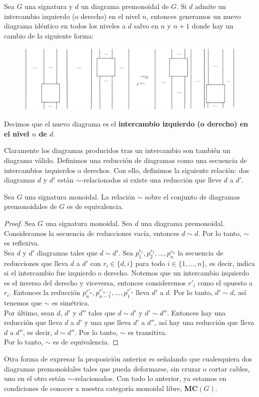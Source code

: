 \documentclass[../main.tex]{subfiles}
\begin{document}
\begin{dfn}
	Sea $G$ una signatura y $d$ un diagrama premonoidal de $G$. Si $d$ admite un intercambio izquierdo (o derecho) en el nivel $n$, entonces generamos un nuevo diagrama idéntico en todos los niveles a $d$ salvo en $n$ y $n+1$ donde hay un cambio de la siguiente forma: 
	
	\begin{figure}[H]
		\includegraphics[scale=5]{diagrama/izqder.png}
		\centering
	\end{figure}	
Decimos que el nuevo diagrama es el \textbf{intercambio izquierdo (o derecho) en el nivel $n$ de $d$}.
\end{dfn}
Claramente los diagramas producidos tras un intercambio son también un diagrama válido. Definimos una reducción de diagramas como una secuencia de intercambios izquierdos o derechos. Con ello, definimos la siguiente relación: dos diagramas $d$ y $d'$ están $\sim$-relacionados si existe una reducción que lleve $d$ a $d'$. 

\begin{prop}
	Sea $G$ una signatura monoidal. La relación $\sim$ sobre el conjunto de diagramas premonoidales de $G$ es de equivalencia. 
	\label{equiv}
\end{prop}
\begin{proof}
	Sea $G$ una signatura monoidal.
	Sea $d$ una diagrama premonoidal. Consideramos la secuencia de reducciones vacía, entonces $d \sim d$. Por lo tanto, $\sim$ es reflexiva.\\
	Sea $d$ y $d'$ diagramas tales que $d \sim d'$. Sea $p_1^{r_1}, p_2^{r_2}, ... , p_n^{r_n}$ la secuencia de reducciones que lleva $d$ a $d'$ con $r_i \in \{ d, i\}$ para todo $i \in \{1, ...,n \}$, es decir, indica si el intercambio fue izquierdo o derecho. Notemos que un intercambio izquierdo es el inverso del derecho y viceversa, entonces consideremos $r'_{i}$ como el opuesto a $r_{i}$. Entonces la reducción $p_n^{r'_n}, p_{n-1}^{r'_{n-1}}, ... , p_1^{r'_1}$ lleva $d'$ a $d$. Por lo tanto, $d' \sim d$, así tenemos que $\sim$ es simétrica. \\  
	Por último, sean $d$, $d'$ y $d''$ tales que $d \sim d'$ y $d' \sim d''$. Entonces hay una reducción que lleva $d$ a $d'$ y una que lleva $d'$ a $d''$, así hay una reducción que lleva $d$ a $d''$, es decir, $d \sim d''$. Por lo tanto, $\sim$ es transitiva. \\
	Por lo tanto, $\sim$ es de equivalencia. 
\end{proof}
Otra forma de expresar la proposición anterior es señalando que cualesquiera dos diagramas premonoidales tales que pueda deformarse, sin cruzar o cortar cables, uno en el otro están $\sim$-relacionados. Con todo lo anterior, ya estamos en condiciones de conocer a nuestra categoría monoidal libre, \textbf{MC}$(G)$.
\end{document}
